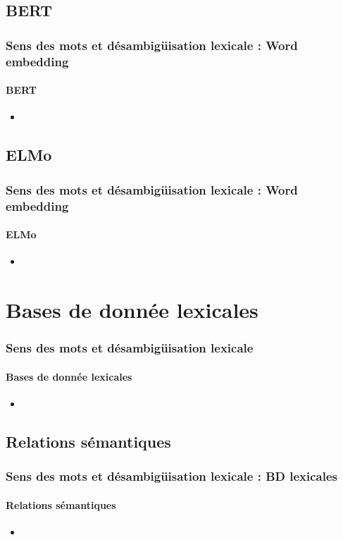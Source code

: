 \documentclass[xcolor=table]{beamer}
\begin{document}
\subsection{BERT}

\begin{frame}
\frametitle{Sens des mots et désambigüisation lexicale : Word embedding}
\framesubtitle{BERT}

\begin{itemize}
	\item 
\end{itemize}

\end{frame}

\subsection{ELMo}

\begin{frame}
\frametitle{Sens des mots et désambigüisation lexicale : Word embedding}
\framesubtitle{ELMo}

\begin{itemize}
	\item 
\end{itemize}

\end{frame}

\section{Bases de donnée lexicales}

\begin{frame}
\frametitle{Sens des mots et désambigüisation lexicale}
\framesubtitle{Bases de donnée lexicales}

\begin{itemize}
	\item 	
\end{itemize}

\end{frame}

\subsection{Relations sémantiques}

\begin{frame}
\frametitle{Sens des mots et désambigüisation lexicale : BD lexicales}
\framesubtitle{Relations sémantiques}

\begin{itemize}
	\item 
\end{itemize}

\end{frame}
\end{document}
